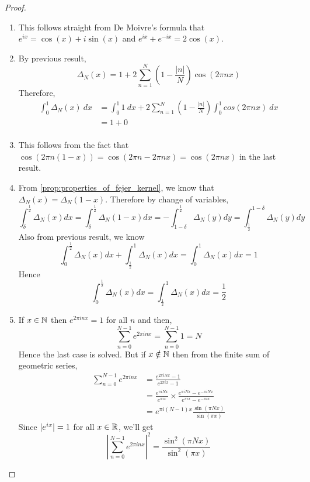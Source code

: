   \begin{proof}
    \begin{enumerate}[label=(\alph*)]
      \item
        This follows straight from De Moivre's formula that $e^{ix} = \cos(x) + i\sin(x)$ and $e^{ix} + e^{-ix}  = 2\cos(x)$.

      \item 
        By previous result,
          $$\Delta_N(x) = 1 + 2\sum_{n=1}^N \left(1-\frac{|n|}{N}\right)\cos(2\pi nx)$$
        Therefore, 
        \begin{align*}
          \int_0^1\Delta_N(x) \ dx &= \int_0^1 1\ dx + 2\sum_{n=1}^N \left(1 - \frac{|n|}{N}\right)\int_0^1cos(2\pi nx) \ dx \\
                &= 1 + 0 \\ 
        \end{align*}

      \item
        This follows from the fact that $\cos(2\pi n(1-x))  = \cos(2\pi n - 2\pi nx) = \cos(2\pi nx)$ in the last result.
      \item
        From \ref{prop:properties_of_fejer_kernel}, we know that $\Delta_N(x) = \Delta_N(1-x)$. Therefore by change of variables,
        \begin{displaymath}
          \int_\delta^{\frac{1}{2}}\Delta_N(x) dx = \int_\delta^{\frac{1}{2}}\Delta_N(1-x)dx = -\int_{1-\delta}^{\frac{1}{2}} \Delta_N(y)dy = \int_{\frac{1}{2}}^{1 - \delta}\Delta_N(y) dy
        \end{displaymath}
        Also from previous result, we know
        $$\int_0^{\frac{1}{2}}\Delta_N(x) dx + \int_{\frac{1}{2}}^1\Delta_N(x) dx = \int_0^1\Delta_N(x) dx = 1$$
        Hence $$\int_0^{\frac{1}{2}} \Delta_N(x) dx = \int_{\frac{1}{2}}^1 \Delta_N(x) dx = \frac{1}{2}$$

      \item
        If $x\in \mathbb N$ then $e^{2\pi inx} = 1$ for all $n$ and then,
        \begin{displaymath}
          \sum_{n=0}^{N-1}e^{2\pi inx} = \sum_{n=0}^{N-1} 1 = N
        \end{displaymath}
        Hence the last case is solved. But if $x\notin \mathbb N$ then from the finite sum of geometric series,
        \begin{align*}
          \sum_{n=0}^{N-1}e^{2\pi inx} &= \frac{e^{2\pi iNx} - 1}{e^{2\pi ix} - 1} \\
                  & = \frac{e^{\pi iNx}}{e^{\pi ix}} \times \frac{e^{\pi iNx} - e^{-\pi iNx}}{e^{\pi ix} - e^{-\pi ix}} \\
                  & = e^{\pi i(N-1)x}\frac{\sin(\pi Nx)}{\sin(\pi x)}
        \end{align*}
        Since $\lvert e^{ix}\rvert = 1$ for all $x\in \mathbb R$, we'll get
        \begin{displaymath}
          \left|\sum_{n=0}^{N-1}e^{2 \pi inx}\right|^2 = \frac{\sin^2(\pi Nx)}{\sin^2(\pi x)}  
        \end{displaymath}


\end{enumerate}
\end{proof}
